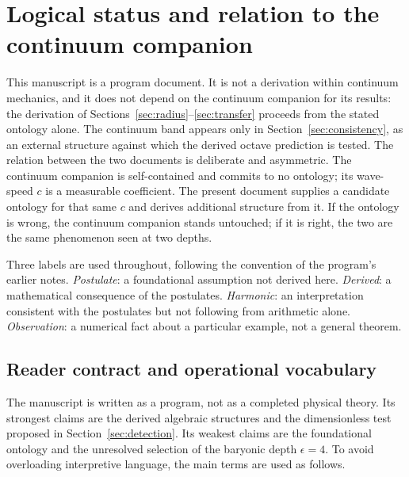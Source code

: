 \documentclass[11pt,a4paper]{article}
\begin{document}
\section{Logical status and relation to the continuum companion}\label{sec:status}

This manuscript is a program document. It is not a derivation within continuum mechanics, and it does not depend on the continuum companion for its results: the derivation of Sections~\ref{sec:radius}--\ref{sec:transfer} proceeds from the stated ontology alone. The continuum band appears only in Section~\ref{sec:consistency}, as an external structure against which the derived octave prediction is tested. The relation between the two documents is deliberate and asymmetric. The continuum companion is self-contained and commits to no ontology; its wave-speed $c$ is a measurable coefficient. The present document supplies a candidate ontology for that same $c$ and derives additional structure from it. If the ontology is wrong, the continuum companion stands untouched; if it is right, the two are the same phenomenon seen at two depths.

Three labels are used throughout, following the convention of the program's earlier notes. \emph{Postulate}: a foundational assumption not derived here. \emph{Derived}: a mathematical consequence of the postulates. \emph{Harmonic}: an interpretation consistent with the postulates but not following from arithmetic alone. \emph{Observation}: a numerical fact about a particular example, not a general theorem.

\subsection*{Reader contract and operational vocabulary}
The manuscript is written as a program, not as a completed physical theory. Its strongest claims are the derived algebraic structures and the dimensionless test proposed in Section~\ref{sec:detection}. Its weakest claims are the foundational ontology and the unresolved selection of the baryonic depth $\epsilon=4$. To avoid overloading interpretive language, the main terms are used as follows.
\end{document}
